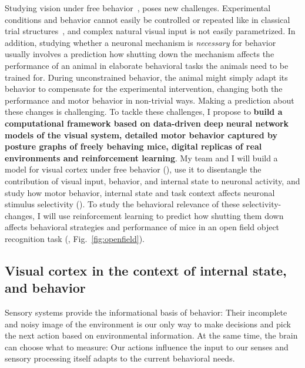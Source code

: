 \documentclass[B2,COG]{ercgrant}
\begin{document}
Studying vision under free behavior~\parencite{Parker2022-ac}, poses new challenges. 
Experimental conditions and behavior cannot easily be controlled or repeated like in classical trial structures~\parencite{Huk2018-ez}, and complex natural visual input is not easily parametrized. 
In addition, studying whether a neuronal mechanism is \textit{necessary} for  behavior usually involves a prediction how shutting down the mechanism affects the performance of an animal in elaborate behavioral tasks the animals need to be trained for.
During unconstrained behavior, the animal might simply adapt its behavior to compensate for the experimental intervention, changing both the performance and motor behavior in non-trivial ways.  
Making a prediction about these changes is challenging.
To tackle these challenges, I propose to \textbf{build a computational framework based on data-driven deep neural network models of the visual system, detailed motor behavior captured by posture graphs of freely behaving mice, digital replicas of real environments and reinforcement learning}.
My team and I will build a model for visual cortex under free behavior (), use it to disentangle the contribution of visual input, behavior, and internal state to neuronal activity, and study how motor behavior, internal state and task context affects neuronal stimulus selectivity (). To study the behavioral relevance of these selectivity-changes, I will use reinforcement learning to predict how shutting them down affects behavioral strategies and performance of mice in an open field object recognition task  (, Fig.~\ref{fig:openfield}).


\subsection{Visual cortex in the context of internal state, and behavior}

Sensory systems provide the informational basis of behavior: Their incomplete and noisy image of the environment is our only way to make decisions and pick the next action based on environmental information. 
At the same time, the brain can choose what to measure: Our actions influence the input to our senses and sensory processing itself adapts to the current behavioral needs. 
\end{document}
